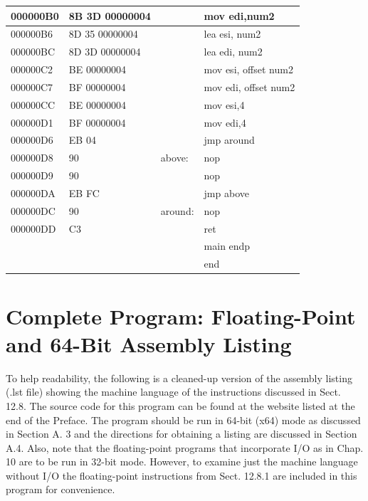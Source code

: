 \documentclass[10pt]{book}
\begin{document}
\begin{center}
\begin{tabular}{|l|l|l|l|}
\hline
000000B0 & 8B 3D 00000004 &  & mov edi,num2 \\
\hline
000000B6 & 8D 35 00000004 &  & lea esi, num2 \\
\hline
000000BC & 8D 3D 00000004 &  & lea edi, num2 \\
\hline
000000C2 & BE 00000004 &  & mov esi, offset num2 \\
\hline
000000C7 & BF 00000004 &  & mov edi, offset num2 \\
\hline
000000CC & BE 00000004 &  & mov esi,4 \\
\hline
000000D1 & BF 00000004 &  & mov edi,4 \\
\hline
000000D6 & EB 04 &  & jmp around \\
\hline
000000D8 & 90 & above: & nop \\
\hline
000000D9 & 90 &  & nop \\
\hline
000000DA & EB FC &  & jmp above \\
\hline
000000DC & 90 & around: & nop \\
\hline
000000DD & C3 &  & ret \\
\hline
 &  &  & main endp \\
\hline
 &  &  & end \\
\hline
\end{tabular}
\end{center}

\section{Complete Program: Floating-Point and 64-Bit Assembly Listing}
To help readability, the following is a cleaned-up version of the assembly listing (.lst file) showing the machine language of the instructions discussed in Sect. 12.8. The source code for this program can be found at the website listed at the end of the Preface. The program should be run in 64-bit (x64) mode as discussed in Section A. 3 and the directions for obtaining a listing are discussed in Section A.4.
Also, note that the floating-point programs that incorporate I/O as in Chap. 10 are to be run in 32-bit mode. However, to examine just the machine language without I/O the floating-point instructions from Sect. 12.8.1 are included in this program for convenience.
\end{document}
